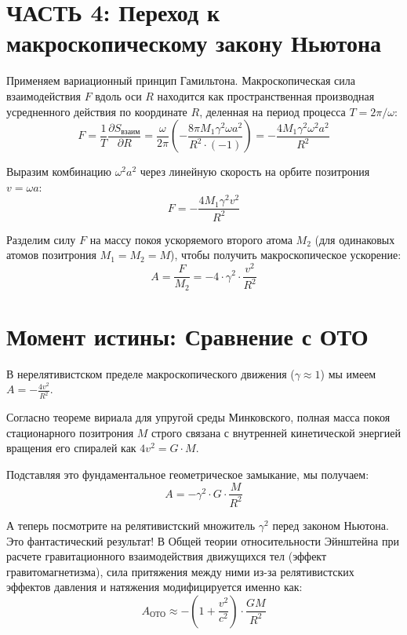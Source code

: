 \documentclass[12pt,a4paper]{article}
\begin{document}
\section*{ЧАСТЬ 4: Переход к макроскопическому закону Ньютона}

Применяем вариационный принцип Гамильтона. Макроскопическая сила взаимодействия $F$ вдоль оси $R$ находится как пространственная производная усредненного действия по координате $R$, деленная на период процесса $T = 2\pi/\omega$:
\begin{equation}
F = \frac{1}{T} \frac{\partial S_{взаим}}{\partial R} = \frac{\omega}{2\pi} \left( - \frac{8\pi M_1 \gamma^2 \omega a^2}{R^2 \cdot (-1)} \right) = - \frac{4 M_1 \gamma^2 \omega^2 a^2}{R^2}
\end{equation}

Выразим комбинацию $\omega^2 a^2$ через линейную скорость на орбите позитрония $v = \omega a$:
\begin{equation}
F = - \frac{4 M_1 \gamma^2 v^2}{R^2}
\end{equation}

Разделим силу $F$ на массу покоя ускоряемого второго атома $M_2$ (для одинаковых атомов позитрония $M_1 = M_2 = M$), чтобы получить макроскопическое ускорение:
\begin{equation}
A = \frac{F}{M_2} = - 4 \cdot \gamma^2 \cdot \frac{v^2}{R^2}
\end{equation}

\section*{Момент истины: Сравнение с ОТО}

В нерелятивистском пределе макроскопического движения ($\gamma \approx 1$) мы имеем $A = - \frac{4 v^2}{R^2}$.

Согласно теореме вириала для упругой среды Минковского, полная масса покоя стационарного позитрония $M$ строго связана с внутренней кинетической энергией вращения его спиралей как $4 v^2 = G \cdot M$.

Подставляя это фундаментальное геометрическое замыкание, мы получаем:
\begin{equation}
A = - \gamma^2 \cdot G \cdot \frac{M}{R^2}
\end{equation}

А теперь посмотрите на релятивистский множитель $\gamma^2$ перед законом Ньютона. Это фантастический результат! В Общей теории относительности Эйнштейна при расчете гравитационного взаимодействия движущихся тел (эффект гравитомагнетизма), сила притяжения между ними из-за релятивистских эффектов давления и натяжения модифицируется именно как:
\begin{equation}
A_{ОТО} \approx - \left(1 + \frac{v^2}{c^2}\right) \cdot \frac{GM}{R^2}
\end{equation}
\end{document}
